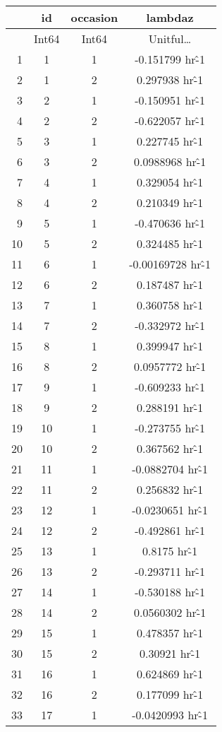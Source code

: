 \documentclass[12pt,a4paper]{article}
\begin{document}
\begin{tabular}{r|ccc}
	& id & occasion & lambdaz\\
	\hline
	& Int64 & Int64 & Unitful…\\
	\hline
	1 & 1 & 1 & -0.151799 hr\^-1 \\
	2 & 1 & 2 & 0.297938 hr\^-1 \\
	3 & 2 & 1 & -0.150951 hr\^-1 \\
	4 & 2 & 2 & -0.622057 hr\^-1 \\
	5 & 3 & 1 & 0.227745 hr\^-1 \\
	6 & 3 & 2 & 0.0988968 hr\^-1 \\
	7 & 4 & 1 & 0.329054 hr\^-1 \\
	8 & 4 & 2 & 0.210349 hr\^-1 \\
	9 & 5 & 1 & -0.470636 hr\^-1 \\
	10 & 5 & 2 & 0.324485 hr\^-1 \\
	11 & 6 & 1 & -0.00169728 hr\^-1 \\
	12 & 6 & 2 & 0.187487 hr\^-1 \\
	13 & 7 & 1 & 0.360758 hr\^-1 \\
	14 & 7 & 2 & -0.332972 hr\^-1 \\
	15 & 8 & 1 & 0.399947 hr\^-1 \\
	16 & 8 & 2 & 0.0957772 hr\^-1 \\
	17 & 9 & 1 & -0.609233 hr\^-1 \\
	18 & 9 & 2 & 0.288191 hr\^-1 \\
	19 & 10 & 1 & -0.273755 hr\^-1 \\
	20 & 10 & 2 & 0.367562 hr\^-1 \\
	21 & 11 & 1 & -0.0882704 hr\^-1 \\
	22 & 11 & 2 & 0.256832 hr\^-1 \\
	23 & 12 & 1 & -0.0230651 hr\^-1 \\
	24 & 12 & 2 & -0.492861 hr\^-1 \\
	25 & 13 & 1 & 0.8175 hr\^-1 \\
	26 & 13 & 2 & -0.293711 hr\^-1 \\
	27 & 14 & 1 & -0.530188 hr\^-1 \\
	28 & 14 & 2 & 0.0560302 hr\^-1 \\
	29 & 15 & 1 & 0.478357 hr\^-1 \\
	30 & 15 & 2 & 0.30921 hr\^-1 \\
	31 & 16 & 1 & 0.624869 hr\^-1 \\
	32 & 16 & 2 & 0.177099 hr\^-1 \\
	33 & 17 & 1 & -0.0420993 hr\^-1 \\

\end{tabular}
\end{document}
